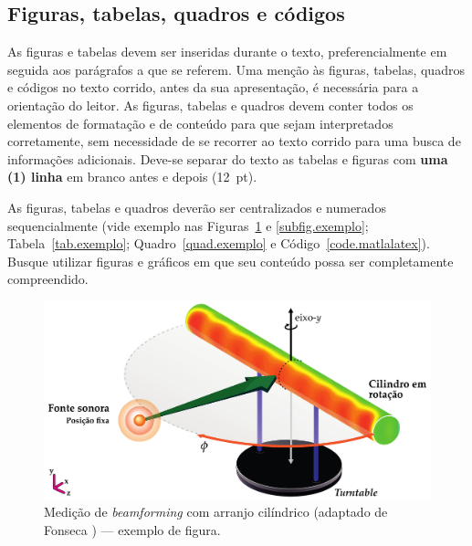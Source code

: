 \subsection{Figuras, tabelas, quadros e códigos}

As figuras e tabelas devem ser inseridas durante o texto, preferencialmente em seguida aos parágrafos a que se referem. Uma menção
às figuras, tabelas, quadros e códigos no texto corrido, antes da sua apresentação, é necessária para a orientação do leitor. As figuras, tabelas e quadros devem conter todos os elementos de formatação e de conteúdo para que sejam interpretados corretamente, sem necessidade de se recorrer ao texto corrido para uma busca de informações adicionais. Deve-se separar do texto as tabelas e figuras com \textbf{uma (1) linha} em branco antes e depois (12~pt). 

\enlargethispage{1em}


As figuras, tabelas e quadros deverão ser centralizados e numerados sequencialmente (vide exemplo nas Figuras~\ref{fig:beamforming} e \ref{subfig.exemplo}; Tabela~\ref{tab.exemplo}; Quadro~\ref{quad.exemplo} e Código~\ref{code.matlalatex}). Busque utilizar figuras e gráficos em que seu conteúdo possa ser completamente compreendido. 

\begin{figure}[!ht] %
	\centering
	\includegraphics[width=0.72\linewidth]{figs/Measurement-Scheme-Fonseca-2013.pdf}%
	\caption{Medição de \textit{beamforming} com arranjo cilíndrico (adaptado de Fonseca \cite{Fonseca-2013}) --- exemplo de figura.}
	\label{fig:beamforming}%
\end{figure}

